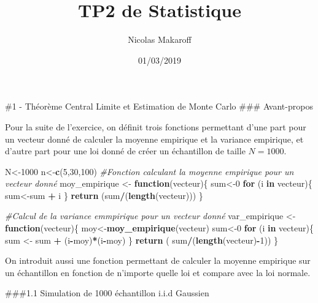 \documentclass[]{article}
\title{TP2 de Statistique}
\author{Nicolas Makaroff}
\date{01/03/2019}
\newenvironment{Shaded}{\begin{snugshade}}{\end{snugshade}}
\newcommand{\CommentTok}[1]{\textcolor[rgb]{0.56,0.35,0.01}{\textit{#1}}}
\newcommand{\ControlFlowTok}[1]{\textcolor[rgb]{0.13,0.29,0.53}{\textbf{#1}}}
\newcommand{\DecValTok}[1]{\textcolor[rgb]{0.00,0.00,0.81}{#1}}
\newcommand{\KeywordTok}[1]{\textcolor[rgb]{0.13,0.29,0.53}{\textbf{#1}}}
\newcommand{\NormalTok}[1]{#1}
\newcommand{\OperatorTok}[1]{\textcolor[rgb]{0.81,0.36,0.00}{\textbf{#1}}}
\newcommand{\StringTok}[1]{\textcolor[rgb]{0.31,0.60,0.02}{#1}}
\begin{document}
\maketitle

\#1 - Théorème Central Limite et Estimation de Monte Carlo \#\#\#
Avant-propos

Pour la suite de l'exercice, on définit trois fonctions permettant d'une
part pour un vecteur donné de calculer la moyenne empirique et la
variance empirique, et d'autre part pour une loi donné de créer un
échantillon de taille \(N=1000\).

\begin{Shaded}
\begin{Highlighting}[]
\NormalTok{N<-}\DecValTok{1000}
\NormalTok{n<-}\KeywordTok{c}\NormalTok{(}\DecValTok{5}\NormalTok{,}\DecValTok{30}\NormalTok{,}\DecValTok{100}\NormalTok{)}
\CommentTok{#Fonction calculant la moyenne empirique pour un vecteur donné}
\NormalTok{moy_empirique <-}\StringTok{ }\ControlFlowTok{function}\NormalTok{(vecteur)\{}
\NormalTok{ sum<-}\DecValTok{0}
 \ControlFlowTok{for}\NormalTok{ (i }\ControlFlowTok{in}\NormalTok{ vecteur)\{}
\NormalTok{   sum<-sum }\OperatorTok{+}\StringTok{ }\NormalTok{i}
\NormalTok{ \}}
 \KeywordTok{return}\NormalTok{ (sum}\OperatorTok{/}\NormalTok{(}\KeywordTok{length}\NormalTok{(vecteur)))}
\NormalTok{\}}

\CommentTok{#Calcul de la variance emmpirique pour un vecteur donné}
\NormalTok{var_empirique <-}\StringTok{ }\ControlFlowTok{function}\NormalTok{(vecteur)\{}
\NormalTok{  moy<-}\KeywordTok{moy_empirique}\NormalTok{(vecteur)}
\NormalTok{  sum<-}\DecValTok{0}
  \ControlFlowTok{for}\NormalTok{ (i }\ControlFlowTok{in}\NormalTok{ vecteur)\{}
\NormalTok{    sum <-}\StringTok{ }\NormalTok{sum  }\OperatorTok{+}\StringTok{ }\NormalTok{(i}\OperatorTok{-}\NormalTok{moy)}\OperatorTok{*}\NormalTok{(i}\OperatorTok{-}\NormalTok{moy)}
\NormalTok{  \}}
  \KeywordTok{return}\NormalTok{ ( sum}\OperatorTok{/}\NormalTok{(}\KeywordTok{length}\NormalTok{(vecteur)}\OperatorTok{-}\DecValTok{1}\NormalTok{))}
\NormalTok{\}}
\end{Highlighting}
\end{Shaded}

On introduit aussi une fonction permettant de calculer la moyenne
empirique sur un échantillon en fonction de n'importe quelle loi et
compare avec la loi normale.

\#\#\#1.1 Simulation de 1000 échantillon i.i.d Gaussien
\end{document}
